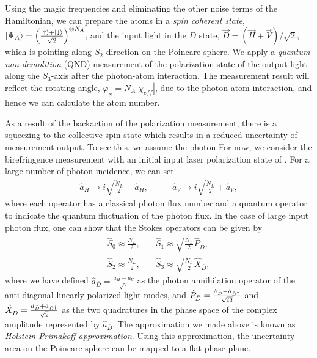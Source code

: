 \documentclass[preprint,aps,pra,onecolumn]{revtex4-1} %
\begin{document}
Using the magic frequencies and eliminating the other noise terms of the Hamiltonian, we can prepare the atoms in a \textit{spin coherent state}, $ \lvert{\Psi_A}\rangle=\left(\frac{\lvert{\uparrow}\rangle+\lvert{\downarrow}\rangle}{\sqrt{2}}\right)^{\otimes N_A} $, and the input light in the $ D $ state, $ \vec{D}=\left( \vec{H}+\vec{V}\right)/\sqrt{2} $, which is pointing along $ S_2 $ direction on the Poincare sphere. We apply a \textit{quantum non-demolition} (QND) measurement of the polarization state of the output light along the $ S_3 $-axis after the photon-atom interaction.
The measurement result will reflect the rotating angle, $ \varphi_{_N} = N_A \left| \chi_{e\!f\!f} \right| $, due to the photon-atom interaction, and hence we can calculate the atom number.

As a result of the backaction of the polarization measurement, there is a squeezing to the collective spin state which results in a reduced uncertainty of measurement output. To see this, we assume the photon For now, we consider the birefringence measurement with an initial input laser polarization state of . For a large number of photon incidence, we can set 
\begin{align}
\hat{a}_H \rightarrow i\sqrt{\frac{\dot{N}_L}{2}} + \hat{a}_H, &\quad\quad
\hat{a}_V \rightarrow i\sqrt{\frac{\dot{N}_L}{2}} + \hat{a}_V,
\end{align}
where each operator has a classical photon flux number and a quantum operator to indicate the quantum fluctuation of the photon flux. In the case of large input photon flux, one can show that the Stokes operators can be given by
\begin{align}
\hat{S}_0 \approx \frac{\dot{N}_L}{2}, &\quad 
\hat{S}_1 
\approx \sqrt{\frac{\dot{N}_L}{2}} \hat{P}_{\bar{D}}, \\ 
\hat{S}_2 \approx \frac{\dot{N}_L}{2}, &\quad
\hat{S}_3 
\approx \sqrt{\frac{\dot{N}_L}{2}} \hat{X}_{\bar{D}},
\end{align}
where we have defined $ \hat{a}_{\bar{D}} = \frac{\hat{a}_H -\hat{a}_V}{\sqrt{2}} $ as the photon annihilation operator of the anti-diagonal linearly polarized light modes, and $ \hat{P}_{\bar{D}}=\frac{\hat{a}_{\bar{D}}-\hat{a}_{\bar{D}^\dagger}}{\sqrt{i2}} $ and $ \hat{X}_{\bar{D}}=\frac{\hat{a}_{\bar{D}}+\hat{a}_{\bar{D}^\dagger}}{\sqrt{2}} $ as the two quadratures in the phase space of the complex amplitude represented by $ \hat{a}_{\bar{D}} $. The approximation we made above is known as \textit{Holstein-Primakoff approximation}. Using this approximation, the uncertainty area on the Poincare sphere can be mapped to a flat phase plane. 
\end{document}
